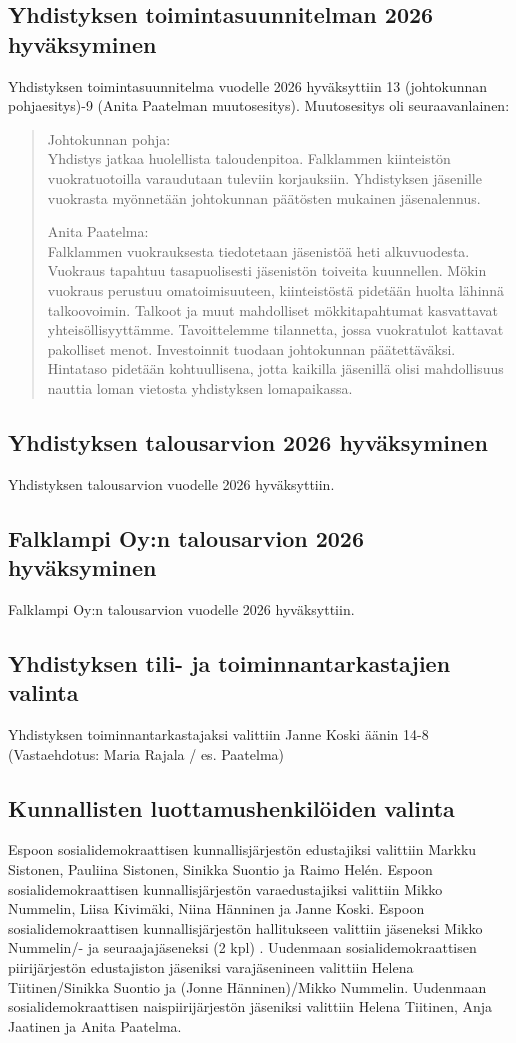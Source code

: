 \documentclass[a4paper,12pt]{article}
\begin{document}
\subsection{Yhdistyksen toimintasuunnitelman 2026 hyväksyminen}
Yhdistyksen toimintasuunnitelma vuodelle 2026 hyväksyttiin 13 (johtokunnan pohjaesitys)-9 (Anita Paatelman muutosesitys). Muutosesitys oli seuraavanlainen:
\begin{quote}
Johtokunnan pohja: \\
Yhdistys jatkaa huolellista taloudenpitoa. Falklammen kiinteistön
vuokratuotoilla varaudutaan tuleviin korjauksiin. Yhdistyksen
jäsenille vuokrasta myönnetään johtokunnan päätösten mukainen
jäsenalennus.

Anita Paatelma: \\
Falklammen vuokrauksesta tiedotetaan
jäsenistöä heti alkuvuodesta. Vuokraus tapahtuu tasapuolisesti
jäsenistön toiveita kuunnellen. Mökin vuokraus perustuu
omatoimisuuteen, kiinteistöstä pidetään huolta lähinnä talkoovoimin.
Talkoot ja muut mahdolliset mökkitapahtumat kasvattavat
yhteisöllisyyttämme. Tavoittelemme tilannetta, jossa vuokratulot
kattavat pakolliset menot. Investoinnit tuodaan johtokunnan
päätettäväksi. Hintataso pidetään kohtuullisena, jotta kaikilla
jäsenillä olisi mahdollisuus nauttia loman vietosta yhdistyksen
lomapaikassa.
\end{quote}
\subsection{Yhdistyksen talousarvion 2026 hyväksyminen}
Yhdistyksen talousarvion vuodelle 2026 hyväksyttiin.
\subsection{Falklampi Oy:n talousarvion 2026 hyväksyminen}
Falklampi Oy:n talousarvion vuodelle 2026 hyväksyttiin.
\subsection{Yhdistyksen tili- ja toiminnantarkastajien valinta}
Yhdistyksen toiminnantarkastajaksi valittiin Janne Koski äänin 14-8 (Vastaehdotus: Maria Rajala / es. Paatelma)
\subsection{Kunnallisten luottamushenkilöiden valinta}
Espoon sosialidemokraattisen kunnallisjärjestön edustajiksi valittiin Markku Sistonen, Pauliina Sistonen, Sinikka Suontio ja Raimo Helén. Espoon sosialidemokraattisen kunnallisjärjestön varaedustajiksi valittiin  Mikko Nummelin, Liisa Kivimäki, Niina Hänninen ja Janne Koski. Espoon sosialidemokraattisen kunnallisjärjestön hallitukseen valittiin jäseneksi Mikko Nummelin/- ja seuraajajäseneksi (2 kpl) . Uudenmaan sosialidemokraattisen piirijärjestön edustajiston jäseniksi varajäsenineen valittiin Helena Tiitinen/Sinikka Suontio ja (Jonne Hänninen)/Mikko Nummelin. Uudenmaan sosialidemokraattisen naispiirijärjestön jäseniksi valittiin Helena Tiitinen, Anja Jaatinen ja Anita Paatelma.
\end{document}
